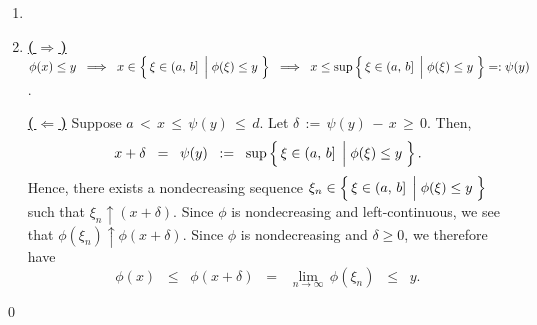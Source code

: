 \begin{enumerate}
\item
\item
	\textbf{\underline{(\,$\Longrightarrow$\,)}}\quad
	$\phi(x) \leq y
	\;\;\Longrightarrow\;\;
		x \in \left\{\,\xi\in(a,\,b] \;\left\vert\; \phi(\xi) \overset{{\color{white}.}}{\leq} y\right.\,\right\}
	\;\; \Longrightarrow \;\;
		x \leq \sup\left\{\,\xi\in(a,\,b] \;\left\vert\; \phi(\xi) \overset{{\color{white}.}}{\leq} y\right.\,\right\} =: \psi(y)$.

	\vskip 0.2cm
	\noindent
	\textbf{\underline{(\,$\Longleftarrow$\,)}}\quad
	Suppose \;$a \,<\, x \,\leq\, \psi(y) \,\leq\, d$.\;
	Let \;$\delta \,:=\, \psi(y) \,-\, x \,\geq\, 0$. Then,
	\begin{equation*}
	x + \delta \;\;=\;\; \psi(y) \;\;:=\;\; \sup\left\{\,\xi\in(a,\,b] \;\left\vert\; \phi(\xi) \overset{{\color{white}.}}{\leq} y\right.\,\right\}.
	\end{equation*}
	Hence, there exists a nondecreasing sequence
	$\xi_{n} \in \left\{\,\xi\in(a,\,b] \;\left\vert\; \phi(\xi) \overset{{\color{white}.}}{\leq} y\right.\,\right\}$
	such that $\xi_{n} \uparrow (x+\delta)$.
	Since $\phi$ is {\color{red}nondecreasing and left-continuous}, we see that $\phi(\xi_{n}) \uparrow \phi(x+\delta)$.
	Since $\phi$ is nondecreasing and $\delta \geq 0$, we therefore have
	\begin{equation*}
	\phi(x) \;\;\leq\;\; \phi(x+\delta) \;\;=\;\; \underset{n\rightarrow\infty}{\lim}\,\phi(\xi_{n}) \;\;\leq\;\; y.
	\end{equation*}
\end{enumerate}
\qed


